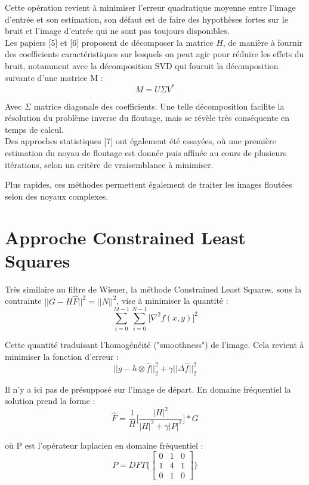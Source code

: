 \documentclass{article}
\begin{document}
	Cette opération revient à minimiser l'erreur quadratique moyenne entre l'image d'entrée et son estimation, son défaut est de faire des hypothèses fortes sur le bruit et l'image d'entrée qui ne sont pas toujours disponibles.
	\\
	
	Les papiers [5] et [6] proposent de décomposer la matrice $H$, de manière à fournir des coefficients caractéristiques sur lesquels on peut agir pour réduire les effets du bruit, notamment avec la décomposition SVD qui fournit la décomposition suivante d'une matrice M :
	$$ M = U \Sigma V^*$$
	
	Avec $\Sigma$ matrice diagonale des coefficients. Une telle décomposition facilite la résolution du problème inverse du floutage, mais se révèle très conséquente en temps de calcul.
	\\
	
	Des approches statistiques [7] ont également été essayées, où une première estimation du noyau de floutage est donnée puis affinée au cours de plusieurs itérations, selon un critère de vraisemblance à minimiser.
	
	Plus rapides, ces méthodes permettent également de traiter les images floutées selon des noyaux complexes.
	\newpage
	
	
\section{Approche Constrained Least Squares}

	Très similaire au filtre de Wiener, la méthode Constrained Least Squares, sous la contrainte $||G - H \hat{F}||^2 = ||N||^2$, vise à minimiser la quantité :
	$$\sum\limits_{i=0}^{M-1} \sum\limits_{i=0}^{N-1} \big[\nabla ^2 f(x,y)]^2 $$
	
	Cette quantité traduisant l'homogénéité ("smoothness") de l'image. Cela revient à minimiser la fonction d'erreur :
	$$||g - h \otimes \hat{f}||^2 _2 + \gamma ||\Delta \hat{f}||^2 _2$$
	
	Il n'y a ici pas de présupposé sur l'image de départ.
	En domaine fréquentiel la solution prend la forme :
	$$\hat F = \frac {1}{H} \bigg[ \frac {|H|^2}{|H|^2 + \gamma |P|^2 } \bigg] * G$$ 
	
	où P est l'opérateur laplacien en domaine fréquentiel : 
	$$ P = DFT\bigg\{\begin{bmatrix}
		0 & 1 & 0 \\
		1 & 4 & 1 \\
		0 & 1 & 0 
		\end{bmatrix}\bigg\}$$
		
\end{document}

